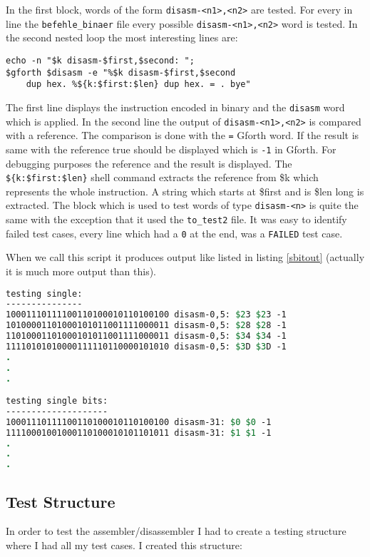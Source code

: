 In the first block, words of the form \texttt{disasm-<n1>,<n2>} are
tested. For every in line the \texttt{befehle\_binaer} file every possible 
\texttt{disasm-<n1>,<n2>} word is tested. In the second nested loop the most 
interesting lines are:

\begin{verbatim}
echo -n "$k disasm-$first,$second: ";
$gforth $disasm -e "%$k disasm-$first,$second 
    dup hex. %${k:$first:$len} dup hex. = . bye"
\end{verbatim}

The first line displays the instruction encoded in binary and the
\texttt{disasm} word which is applied. In the second line the output
of \texttt{disasm-<n1>,<n2>} is compared with a reference. The comparison is
done with the \texttt{=} Gforth word. If the result is same with the reference
true should be displayed which is \texttt{-1} in Gforth. For debugging purposes
the reference and the result is displayed. The \texttt{\$\{k:\$first:\$len\}}
shell command extracts the reference from \$k which represents the whole
instruction. A string which starts at \$first and is \$len long is extracted.
The block which is used to test words of type \texttt{disasm-<n>} is quite the
same with the exception that it used the \texttt{to\_test2} file. It was easy to
identify failed test cases, every line which had a \texttt{0} at the end, was a
\texttt{FAILED} test case.

When we call this script it produces output like listed in listing \ref{sbitout}
(actually it is much more output than this).

\begin{lstlisting}[float, language=csh, caption=Bit field test output,
label=sbitout]
testing single:
---------------
10001110111100110100010110100100 disasm-0,5: $23 $23 -1 
10100001101000101011001111000011 disasm-0,5: $28 $28 -1 
11010001101000101011001111000011 disasm-0,5: $34 $34 -1 
11110101010000111110110000101010 disasm-0,5: $3D $3D -1
.
.
.

testing single bits:
--------------------
10001110111100110100010110100100 disasm-31: $0 $0 -1 
11110001001000110100010101101011 disasm-31: $1 $1 -1 
.
.
.
\end{lstlisting}

\subsection{Test Structure}

In order to test the assembler/disassembler I had to create a testing structure
where I had all my test cases. I created this structure:

